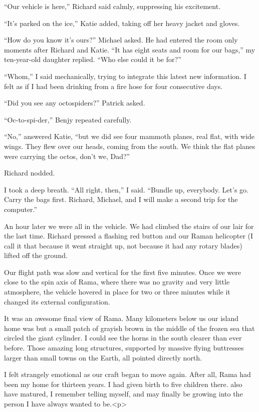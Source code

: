 \documentclass[]{article}
\begin{document}
{“Our vehicle is here,” Richard said calmly, suppressing his excitement.

“It’s parked on the ice,” Katie added, taking off her heavy jacket and gloves.

“How do you know it’s ours?” Michael asked. He had entered the room only moments after Richard and Katie. “It has eight seats and room for our bags,” my ten-year-old daughter replied. “Who else could it be for?”

“Whom,” I said mechanically, trying to integrate this latest new information. I felt as if I had been drinking from a fire hose for four consecutive days.

“Did you see any octospiders?” Patrick asked.

“Oc-to-spi-der,” Benjy repeated carefully.

“No,” answered Katie, “but we did see four mammoth planes, real flat, with wide wings. They flew over our heads, coming from the south. We think the flat planes were carrying the octos, don’t we, Dad?”

Richard nodded.

I took a deep breath. “All right, then,” I said. “Bundle up, everybody. Let’s go. Carry the bags first. Richard, Michael, and I will make a second trip for the computer.”

An hour later we were all in the vehicle. We had climbed the stairs of our lair for the last time. Richard pressed a flashing red button and our Raman helicopter (I call it that because it went straight up, not because it had any rotary blades) lifted off the ground.

Our flight path was slow and vertical for the first five minutes. Once we were close to the spin axis of Rama, where there was no gravity and very little atmosphere, the vehicle hovered in place for two or three minutes while it changed its external configuration.

It was an awesome final view of Rama. Many kilometers below us our island home was but a small patch of grayish brown in the middle of the frozen sea that circled the giant cylinder. I could see the horns in the south clearer than ever before. Those amazing long structures, supported by massive flying buttresses larger than small towns on the Earth, all pointed directly north.

I felt strangely emotional as our craft began to move again. After all, Rama had been my home for thirteen years. I had given birth to five children there. also have matured, I remember telling myself, and may finally be growing into the person I have always wanted to be.<p>

}
\end{document}
